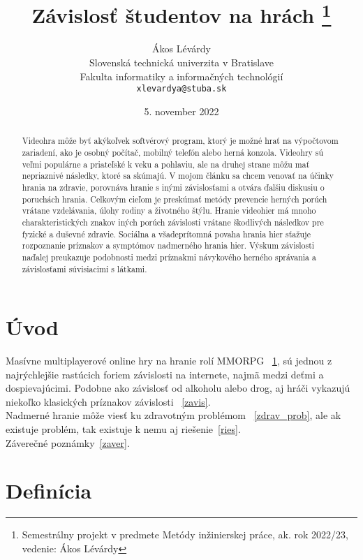 \documentclass[10pt,twoside,english,a4paper]{article}
\title{Závislosť študentov na hrách
\thanks{Semestrálny projekt v predmete Metódy inžinierskej práce, ak. rok 2022/23, vedenie: Ákos Lévárdy}}
\author{Ákos Lévárdy\\[2pt]
	{\small Slovenská technická univerzita v Bratislave}\\
	{\small Fakulta informatiky a informačných technológií}\\
	{\small \texttt{xlevardya@stuba.sk}}	
	}
\date{\small 5. november 2022}
\begin{document}
\maketitle

\begin{abstract}

Videohra môže byť akýkoľvek softvérový program, ktorý je možné hrať na výpočtovom zariadení, ako je osobný počítač, mobilný telefón alebo herná konzola. Videohry sú veľmi populárne a priateľské k veku a pohlaviu, ale na druhej strane môžu mať nepriaznivé následky, ktoré sa skúmajú. V mojom článku sa chcem venovať na účinky hrania na zdravie, porovnáva hranie s inými závislosťami a otvára ďalšiu diskusiu o poruchách hrania. Celkovým cieľom je preskúmať metódy prevencie herných porúch vrátane vzdelávania, úlohy rodiny a životného štýlu. Hranie videohier má mnoho charakteristických znakov iných porúch závislosti vrátane škodlivých následkov pre fyzické a duševné zdravie. Sociálna a všadeprítomná povaha hrania hier sťažuje rozpoznanie príznakov a symptómov nadmerného hrania hier. Výskum závislosti naďalej preukazuje podobnosti medzi príznakmi návykového herného správania a závislosťami súvisiacimi s látkami.

\end{abstract}

\pagebreak

\section*{Úvod}

Masívne multiplayerové online hry na hranie rolí MMORPG ~\ref{def}, sú jednou z najrýchlejšie rastúcich foriem závislosti na internete, najmä medzi deťmi a dospievajúcimi. Podobne ako závislosť od alkoholu alebo drog, aj hráči vykazujú niekoľko klasických príznakov závislosti ~\ref{zavis}.\\
Nadmerné hranie môže viesť ku zdravotným problémom ~\ref{zdrav_prob}, ale ak existuje problém, tak existuje k nemu aj riešenie~\ref{ries}.\\
Záverečné poznámky~\ref{zaver}.

\section{Definícia} \label{def}
 
\end{document}
